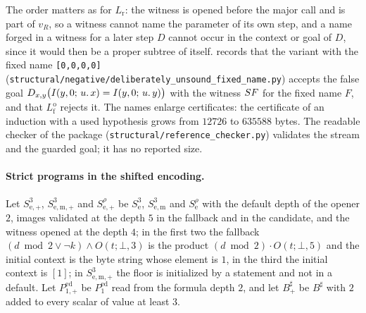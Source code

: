 
The order matters as for $L_{\mathrm r}$: the witness is opened before the major call and is part of
$v_R$, so a witness cannot name the parameter of its own step, and a name forged in a witness for a
later step $D$ cannot occur in the context or goal of $D$, since it would then be a proper subtree
of itself.  records that the variant with the fixed name
\texttt{[0,0,0,0]} (\texttt{structural/negative/deliberately\_unsound\_fixed\_name.py}) accepts the
false goal $D_{x,y}\bigl(I(y,0;\,u.\,x)=I(y,0;\,u.\,y)\bigr)$ with the witness $S F$ for the fixed
name $F$, and that $L^{\mathrm o}_{\mathrm f}$ rejects it. The names enlarge certificates: the
certificate of an induction with a used hypothesis grows from $12726$ to $635588$ bytes. The
readable checker of the package (\texttt{structural/reference\_checker.py}) validates the stream and
the guarded goal; it has no reported size.

\paragraph{Strict programs in the shifted encoding.} Let $S^{3}_{\mathrm e,+}$,
$S^{3}_{\mathrm{e,m},+}$ and $S^{\rho}_{\mathrm e,+}$ be $S^{3}_{\mathrm e}$, $S^{3}_{\mathrm{e,m}}$
and $S^{\rho}_{\mathrm e}$ with the default depth of the opener $2$, images validated at the depth
$5$ in the fallback and in the candidate, and the witness opened at the depth $4$; in the first two
the fallback $(d\bmod 2\lor\neg k)\land O(t;\bot,3)$ is the product $(d\bmod 2)\cdot O(t;\bot,5)$
and the initial context is the byte string whose element is $1$, in the third the initial context
is $[1]$; in $S^{3}_{\mathrm{e,m},+}$ the floor is initialized by a statement and not in a default.
Let $P^{\mathrm{ed}}_{1,+}$ be $P^{\mathrm{ed}}_{1}$ read from the formula depth $2$, and let
$B^{\sharp}_{+}$ be $B^{\sharp}$ with $2$ added to every scalar of value at least $3$.

